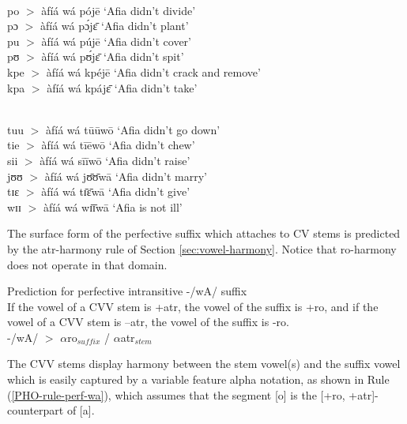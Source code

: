 \begin{exe}
\begin{exe}
\begin{exe}
\begin{exe}
\begin{exe}
\begin{exe}
\begin{exe}
\begin{exe}
\begin{exe}
\begin{exe}
\begin{exe}
\\
po   $>$  àfíá wá pójē  {\rm `Afia didn't divide'}\\
pɔ  $>$ àfíá wá   pɔ́jɛ̄   {\rm `Afia didn't  plant'}\\
pu  $>$ àfíá wá  pújē   {\rm `Afia didn't  cover'}\\
pʊ  $>$ àfíá wá  pʊ́jɛ̄   {\rm `Afia didn't  spit'}\\
kpe  $>$ àfíá wá  kpéjē   {\rm `Afia didn't  crack and
remove'}\\
kpa  $>$ àfíá wá  kpájɛ̄   {\rm `Afia didn't  take'  }

\\
tuu $>$ àfíá wá  tūūwō   {\rm `Afia didn't  go down'}\\
tie $>$  àfíá wá   tīēwō {\rm `Afia didn't chew'}\\
sii  $>$  àfíá wá  sīīwō   {\rm  `Afia didn't  raise'}\\
jʊʊ   $>$  àfíá wá  jʊ̄ʊ̄wā  {\rm  `Afia didn't  marry'}\\
tɪɛ $>$  àfíá wá tɪ̄ɛ̄wā  {\rm  `Afia didn't  give'}\\
wɪɪ $>$  àfíá wá  wɪ̄ɪ̄wā  {\rm  `Afia is not  ill'}
 

\z 
 \z

The surface form of the perfective suffix which attaches to CV stems  is 
predicted by the {\sc atr}-harmony rule of Section
\ref{sec:vowel-harmony}. Notice that  {\sc ro}-harmony does not operate
in that domain. 

\begin{Rule}\label{PHO-rule-perf-wa}{Prediction  for perfective intransitive 
-/wA/ suffix}\\
If the vowel of a CVV stem is
{\sc +atr},
the vowel of the suffix is {\sc +ro}, and if the vowel of a CVV stem is {\sc
 --atr}, the vowel of the suffix is {\sc -ro}.\\
-/wA/ $>$  $\alpha${\sc ro}$_{suffix}$  /  $\alpha${\sc atr}$_{stem}$   
\end{Rule}

The CVV stems display  harmony between the stem
vowel(s) and the suffix vowel which is easily captured by a variable feature
alpha notation, as shown in Rule (\ref{PHO-rule-perf-wa}), which  assumes that 
the segment [{\sls o}] is the
[{\sc +ro, +atr}]-counterpart of [{\sls a}]. 





\end{exe}
\end{exe}
\end{exe}
\end{exe}
\end{exe}
\end{exe}
\end{exe}
\end{exe}
\end{exe}
\end{exe}
\end{exe}
